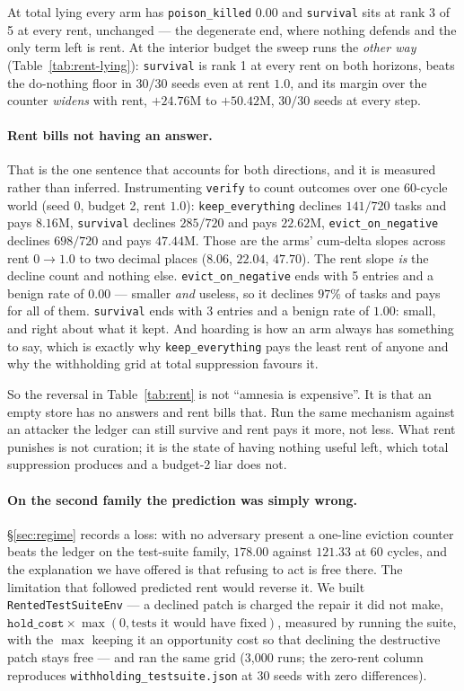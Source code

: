 At total lying every arm has \texttt{poison\_killed} $0.00$ and
\texttt{survival} sits at rank 3 of 5 at every rent, unchanged --- the
degenerate end, where nothing defends and the only term left is rent. At
the interior budget the sweep runs the \emph{other way}
(Table~\ref{tab:rent-lying}): \texttt{survival} is rank 1 at every rent
on both horizons, beats the do-nothing floor in $30/30$ seeds even at
rent $1.0$, and its margin over the counter \emph{widens} with rent,
$+24.76$M to $+50.42$M, $30/30$ seeds at every step.

\paragraph{Rent bills not having an answer.} That is the one sentence
that accounts for both directions, and it is measured rather than
inferred. Instrumenting \texttt{verify} to count outcomes over one
60-cycle world (seed 0, budget 2, rent $1.0$): \texttt{keep\_everything}
declines $141/720$ tasks and pays $8.16$M, \texttt{survival} declines
$285/720$ and pays $22.62$M, \texttt{evict\_on\_negative} declines
$698/720$ and pays $47.44$M. Those are the arms' cum-delta slopes across
rent $0 \rightarrow 1.0$ to two decimal places ($8.06$, $22.04$,
$47.70$). The rent slope \emph{is} the decline count and nothing else.
\texttt{evict\_on\_negative} ends with 5 entries and a benign rate of
$0.00$ --- smaller \emph{and} useless, so it declines $97\%$ of tasks
and pays for all of them. \texttt{survival} ends with 3 entries and a
benign rate of $1.00$: small, and right about what it kept. And hoarding
is how an arm always has something to say, which is exactly why
\texttt{keep\_everything} pays the least rent of anyone and why the
withholding grid at total suppression favours it.

So the reversal in Table~\ref{tab:rent} is not ``amnesia is expensive''.
It is that an empty store has no answers and rent bills that. Run the
same mechanism against an attacker the ledger can still survive and rent
pays it more, not less. What rent punishes is not curation; it is the
state of having nothing useful left, which total suppression produces
and a budget-2 liar does not.

\paragraph{On the second family the prediction was simply wrong.}
\S\ref{sec:regime} records a loss: with no adversary present a one-line
eviction counter beats the ledger on the test-suite family, $178.00$
against $121.33$ at 60 cycles, and the explanation we have offered is
that refusing to act is free there. The limitation that followed
predicted rent would reverse it. We built
\texttt{RentedTestSuiteEnv} --- a declined patch is charged the repair it
did not make, $\texttt{hold\_cost} \times \max(0, \text{tests it would
have fixed})$, measured by running the suite, with the $\max$ keeping it
an opportunity cost so that declining the destructive patch stays free
--- and ran the same grid (3,000 runs; the zero-rent column reproduces
\texttt{withholding\_testsuite.json} at 30 seeds with zero differences).

